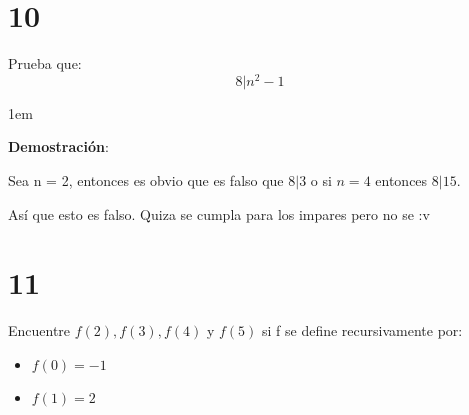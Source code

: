 \documentclass[12pt, fleqn]{article}                            %
\newenvironment{SmallIndentation}[1][0.75em]                    %
        {\begin{adjustwidth}{#1}{}\begin{footnotesize}}             %
        {\end{footnotesize}\end{adjustwidth}}                       %
\theoremstyle{break}                                            %
\begin{document}
\clearpage
\section{10}

    Prueba que:
    \begin{equation*}
        8 | n^2 - 1
    \end{equation*}

    \begin{SmallIndentation}[1em]
        \textbf{Demostración}:

        Sea n = 2, entonces es obvio que es falso que $8 | 3$ o si $n = 4$ entonces
        $8 | 15$.

        Así que esto es falso. Quiza se cumpla para los impares pero no se :v

    \end{SmallIndentation}


\clearpage
\section{11}

    Encuentre $f(2), f(3), f(4)$ y $f(5)$ si f se define recursivamente por:
    \begin{itemize}
        \item $f(0) = -1 $
        \item $f(1) = 2  $
    \end{itemize}
\end{document}
